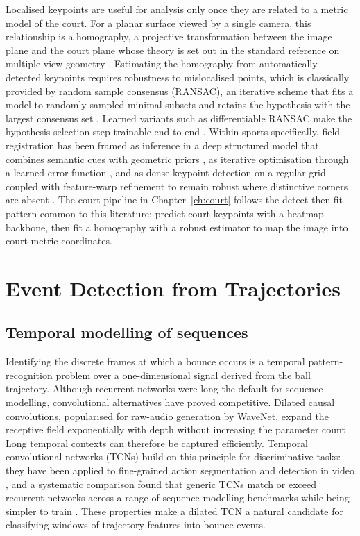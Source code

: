 Localised keypoints are useful for analysis only once they are related to a
metric model of the court. For a planar surface viewed by a single camera,
this relationship is a homography, a projective transformation between the
image plane and the court plane whose theory is set out in the standard
reference on multiple-view geometry \cite{hartley2004mvg}. Estimating the
homography from automatically detected keypoints requires robustness to
mislocalised points, which is classically provided by random sample consensus
(RANSAC), an iterative scheme that fits a model to randomly sampled minimal
subsets and retains the hypothesis with the largest consensus set
\cite{fischler1981ransac}. Learned variants such as differentiable RANSAC make
the hypothesis-selection step trainable end to end \cite{brachmann2017dsac}.
Within sports specifically, field registration has been framed as inference in
a deep structured model that combines semantic cues with geometric priors
\cite{homayounfar2017sportsfield}, as iterative optimisation through a learned
error function \cite{jiang2020sportsfield}, and as dense keypoint detection on
a regular grid coupled with feature-warp refinement to remain robust where
distinctive corners are absent \cite{nie2021sportsfield}. The court pipeline in
Chapter~\ref{ch:court} follows the detect-then-fit pattern common to this
literature: predict court keypoints with a heatmap backbone, then fit a
homography with a robust estimator to map the image into court-metric
coordinates.

\section{Event Detection from Trajectories}
\label{sec:rw-event}

\subsection{Temporal modelling of sequences}
\label{sec:rw-temporal}

Identifying the discrete frames at which a bounce occurs is a temporal
pattern-recognition problem over a one-dimensional signal derived from the
ball trajectory. Although recurrent networks were long the default for
sequence modelling, convolutional alternatives have proved competitive.
Dilated causal convolutions, popularised for raw-audio generation by WaveNet,
expand the receptive field exponentially with depth without increasing the
parameter count \cite{vandenoord2016wavenet}. Long temporal contexts can
therefore be captured efficiently. Temporal convolutional networks (TCNs) build on
this principle for discriminative tasks: they have been applied to fine-grained
action segmentation and detection in video \cite{lea2017tcn}, and a systematic
comparison found that generic TCNs match or exceed recurrent networks across a
range of sequence-modelling benchmarks while being simpler to train
\cite{bai2018tcn}. These properties make a dilated TCN a natural candidate for
classifying windows of trajectory features into bounce events.

